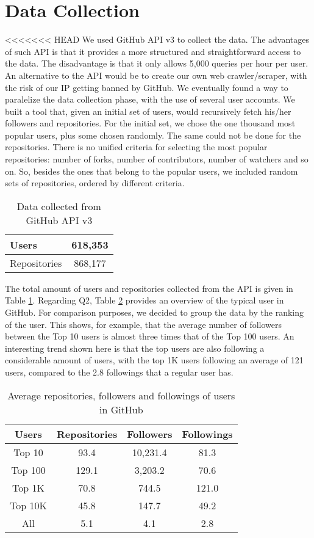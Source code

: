 
\section{Data Collection}
\label{sec:collection}

<<<<<<< HEAD
We used GitHub API v3 \cite{GitHubAPI} to collect the data. The advantages of such API is that it provides a more structured and straightforward access to the data. The disadvantage is that it only allows 5,000 queries per hour per user. An alternative to the API would be to create our own web crawler/scraper, with the risk of our IP getting banned by GitHub. We eventually found a way to paralelize the data collection phase, with the use of several user accounts. We built a tool that, given an initial set of users, would recursively fetch his/her followers and repositories. For the initial set, we chose the one thousand most popular users, plus some chosen randomly. The same could not be done for the repositories. There is no unified criteria for selecting the most popular repositories: number of forks, number of contributors, number of watchers and so on. So, besides the ones that belong to the popular users, we included random sets of repositories, ordered by different criteria.
\begin{table}
\centering
\begin{tabular}{ | l | c | }
	\hline
	Users & 618,353 \\ \hline
	Repositories & 868,177 \\ \hline
\end{tabular}
\caption{Data collected from GitHub API v3}
\label{tbl:datacollected}
\end{table}

The total amount of users and repositories collected from the API is given in Table \ref{tbl:datacollected}. Regarding Q2, Table \ref{tbl:topusers} provides an overview of the typical user in GitHub. For comparison purposes, we decided to group the data by the ranking of the user. This shows, for example, that the average number of followers between the Top 10 users is almost three times that of the Top 100 users. An interesting trend shown here is that the top users are also following a considerable amount of users, with the top 1K users following an average of 121 users, compared to the 2.8 followings that a regular user has.
\begin{table}
\centering
\begin{tabular}{ | c | c | c | c | }
	\hline
	Users & Repositories & Followers & Followings \\ \hline
	Top 10 & 93.4 & 10,231.4 & 81.3 \\ \hline
	Top 100 & 129.1 & 3,203.2 & 70.6 \\ \hline
	Top 1K & 70.8 & 744.5 & 121.0 \\ \hline
	Top 10K & 45.8 & 147.7 & 49.2 \\ \hline
	All & 5.1 & 4.1 & 2.8 \\ \hline
\end{tabular}
\caption{Average repositories, followers and followings of users in GitHub}
\label{tbl:topusers}
\end{table}

